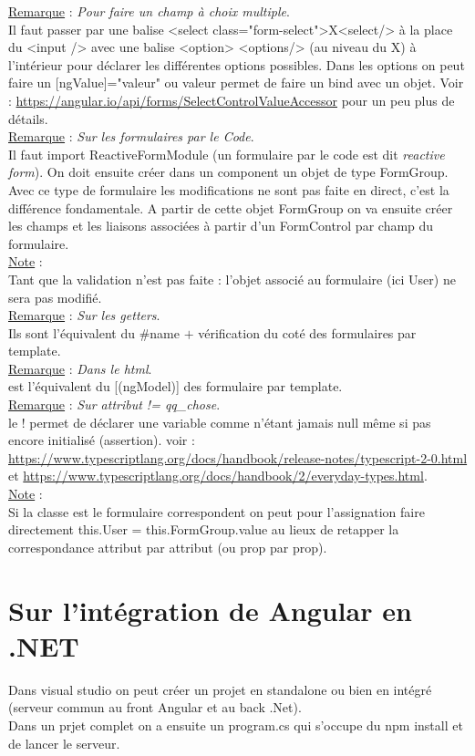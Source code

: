 \documentclass[a4paper,12pt,twoside]{article}
\newcommand{\incode}[1]{{\footnotesize\ttfamily #1}} %
\newcommand{\rem}[2]{\noindent\underline{Remarque} : \textit{#1}.\\ \indent #2}
\newcommand{\note}[1]{\noindent\underline{Note} : \\ \indent #1}
\begin{document}
\rem{Pour faire un champ à choix multiple}{Il faut passer par une balise <select class="form-select">X<select/> à la place du <input /> avec une balise <option> <options/> (au niveau du X) à l'intérieur pour déclarer les différentes options possibles. Dans les options on peut faire un [ngValue]="valeur" ou valeur permet de faire un bind avec un objet. Voir : \url{https://angular.io/api/forms/SelectControlValueAccessor} pour un peu plus de détails.}\\

\rem{Sur les formulaires par le Code}{Il faut import ReactiveFormModule (un formulaire par le code est dit \textit{reactive form}). On doit ensuite créer dans un component un objet de type FormGroup. Avec ce type de formulaire les modifications ne sont pas faite en direct, c'est la différence fondamentale. A partir de cette objet FormGroup on va ensuite créer les champs et les liaisons associées à partir d'un FormControl par champ du formulaire.}\\

\note{Tant que la validation n'est pas faite : l'objet associé au formulaire (ici User) ne sera pas modifié.}\\

\rem{Sur les getters}{Ils sont l'équivalent du \#name $+$ vérification du coté des formulaires par template.}\\

\rem{Dans le html}{[formControlName] est l'équivalent du [(ngModel)] des formulaire par template.}\\

\rem{Sur \incode{attribut != qq\_chose}}{le ! permet de déclarer une variable comme n'étant jamais null même si pas encore initialisé (assertion). voir : \url{https://www.typescriptlang.org/docs/handbook/release-notes/typescript-2-0.html} et \url{https://www.typescriptlang.org/docs/handbook/2/everyday-types.html}.}\\

\note{Si la classe est le formulaire correspondent on peut pour l'assignation faire directement this.User = this.FormGroup.value au lieux de retapper la correspondance attribut par attribut (ou prop par prop).}\\

\section{Sur l'intégration de Angular en .NET}

Dans visual studio on peut créer un projet en standalone ou bien en intégré (serveur commun au front Angular et au back .Net).\\
Dans un prjet complet on a ensuite un program.cs qui s'occupe du npm install et de lancer le serveur.\\
\end{document}
